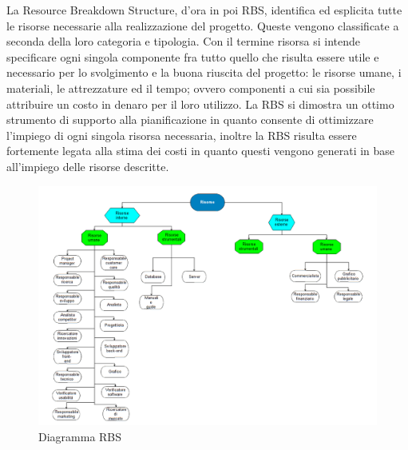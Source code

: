 La Resource Breakdown Structure, d'ora in poi RBS, identifica ed esplicita tutte le
risorse necessarie alla realizzazione del progetto. Queste vengono classificate a seconda della
loro categoria e tipologia. Con il termine risorsa si intende specificare ogni singola
componente fra tutto quello che risulta essere utile e necessario per lo svolgimento e la
buona riuscita del progetto: le risorse umane, i materiali, le attrezzature ed il tempo;
ovvero componenti a cui sia possibile attribuire un costo in denaro per il loro utilizzo. La
RBS si dimostra un ottimo strumento di supporto alla pianificazione in quanto consente
di ottimizzare l'impiego di ogni singola risorsa necessaria, inoltre la RBS risulta essere fortemente
legata alla stima dei costi in quanto questi vengono generati in base all'impiego delle
risorse descritte.

\begin{figure}[H]
\centering %
\includegraphics[scale=0.5]{img/Risorse_rbs.png}
\caption{Diagramma RBS}
\label{fig:Diagramma RBS}
\end{figure}
